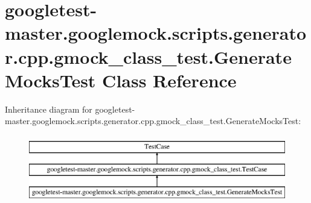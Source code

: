 \hypertarget{classgoogletest-master_1_1googlemock_1_1scripts_1_1generator_1_1cpp_1_1gmock__class__test_1_1_generate_mocks_test}{}\section{googletest-\/master.googlemock.\+scripts.\+generator.\+cpp.\+gmock\+\_\+class\+\_\+test.\+Generate\+Mocks\+Test Class Reference}
\label{classgoogletest-master_1_1googlemock_1_1scripts_1_1generator_1_1cpp_1_1gmock__class__test_1_1_generate_mocks_test}
Inheritance diagram for googletest-\/master.googlemock.\+scripts.\+generator.\+cpp.\+gmock\+\_\+class\+\_\+test.\+Generate\+Mocks\+Test\+:\begin{figure}[H]
\begin{center}
\leavevmode
\includegraphics[height=3.000000cm]{d7/def/classgoogletest-master_1_1googlemock_1_1scripts_1_1generator_1_1cpp_1_1gmock__class__test_1_1_generate_mocks_test}
\end{center}
\end{figure}
